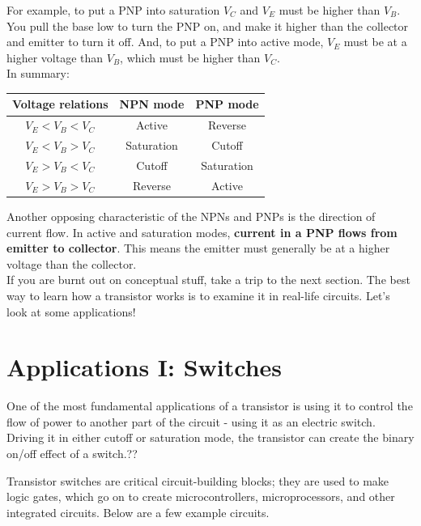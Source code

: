 \documentclass[a4paper, 11pt]{article} %
\begin{document}
For example, to put a PNP into saturation $V_{C}$ and $V_{E}$ must be higher than $V_{B}$. You pull the base low to turn the PNP on, and make it higher than the collector and emitter to turn it off. And, to put a PNP into active mode, $V_{E}$ must be at a higher voltage than $V_{B}$, which must be higher than $V_{C}$.\\

In summary:\\


\begin{center}
\begin{tabular}{|c|c|c|}
\hline 
\textbf{Voltage relations} & \textbf{NPN mode} & \textbf{PNP mode} \\ 
\hline 
$V_{E} < V_{B} < V_{C}$ & Active & Reverse \\ 
\hline 
$V_{E} < V_{B} > V_{C}$ & Saturation & Cutoff \\ 
\hline 
$V_{E} > V_{B} < V_{C}$  & Cutoff & Saturation \\ 
\hline 
$V_{E} > V_{B} > V_{C}$  & Reverse & Active \\ 
\hline 
\end{tabular} 
\end{center}

Another opposing characteristic of the NPNs and PNPs is the direction of current flow. In active and saturation modes, \textbf{current in a PNP flows from emitter to collector}. This means the emitter must generally be at a higher voltage than the collector.\\

If you are burnt out on conceptual stuff, take a trip to the next section. The best way to learn how a transistor works is to examine it in real-life circuits. Let's look at some applications!

\section*{Applications I: Switches}

One of the most fundamental applications of a transistor is using it to control the flow of power to another part of the circuit - using it as an electric switch. Driving it in either cutoff or saturation mode, the transistor can create the binary on/off effect of a switch.??

Transistor switches are critical circuit-building blocks; they are used to make logic gates, which go on to create microcontrollers, microprocessors, and other integrated circuits. Below are a few example circuits.
\end{document}
